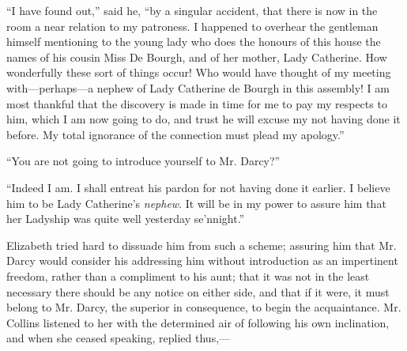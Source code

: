 ``I have found out,'' said he, ``by a singular accident, that there is now in the room a near relation to my patroness. I happened to overhear the gentleman himself mentioning to the young lady who does the honours of this house the names of his cousin Miss De Bourgh, and of her mother, Lady Catherine. How wonderfully these sort of things occur! Who would have thought of my meeting with---perhaps---a nephew of Lady Catherine de Bourgh in this assembly! I am most thankful that the discovery is made in time for me to pay my respects to him, which I am now going to do, and trust he will excuse my not having done it before. My total ignorance of the connection must plead my apology.''

``You are not going to introduce yourself to Mr. Darcy?''

``Indeed I am. I shall entreat his pardon for not having done it earlier. I believe him to be Lady Catherine's \textit{nephew}. It will be in my power to assure him that her Ladyship was quite well yesterday se'nnight.''

Elizabeth tried hard to dissuade him from such a scheme; assuring him that Mr. Darcy would consider his addressing him without introduction as an impertinent freedom, rather than a compliment to his aunt; that it was not in the least necessary there should be any notice on either side, and that if it were, it must belong to Mr. Darcy, the superior in consequence, to begin the acquaintance. Mr. Collins listened to her with the determined air of following his own inclination, and when she ceased speaking, replied thus,---

